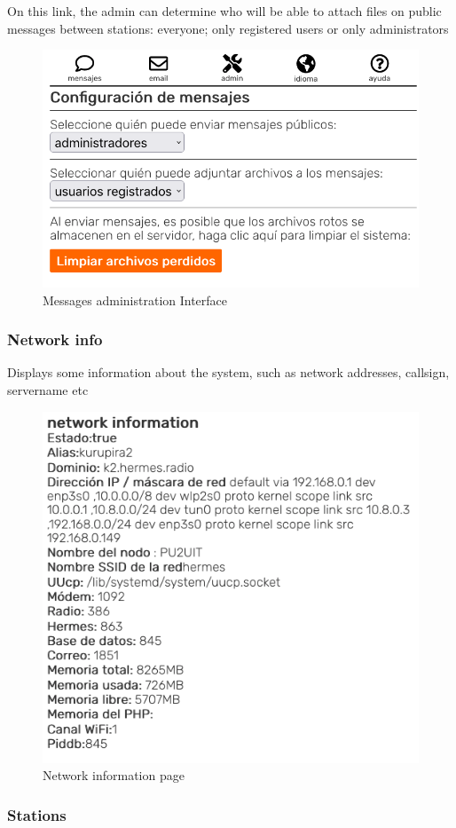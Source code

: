 \documentclass[11pt,a4paper]{article}
\begin{document}
On this link, the admin can determine who will be able to attach files on public messages between stations: everyone; only registered users or only administrators
   
    \begin{figure}[H]
    \centering
    \includegraphics[width=0.5\columnwidth]{screenshots/frontend/es/messageadm.png}
    \caption{Messages administration Interface}
    \label{fig:messageadm}
   
    \end{figure}
    
\subsubsection{Network info} 
\label{gui_net_info}

Displays some information about the system, such as network addresses, callsign, servername etc
     \begin{figure}[H]
     \vspace{-10pt}
    \centering
    \includegraphics[width=0.5\columnwidth]{screenshots/frontend/es/networkinfo.png}
    \caption{Network information page}
    \label{fig:netinfo}
  
    \end{figure}

\subsubsection{Stations} 
\end{document}
